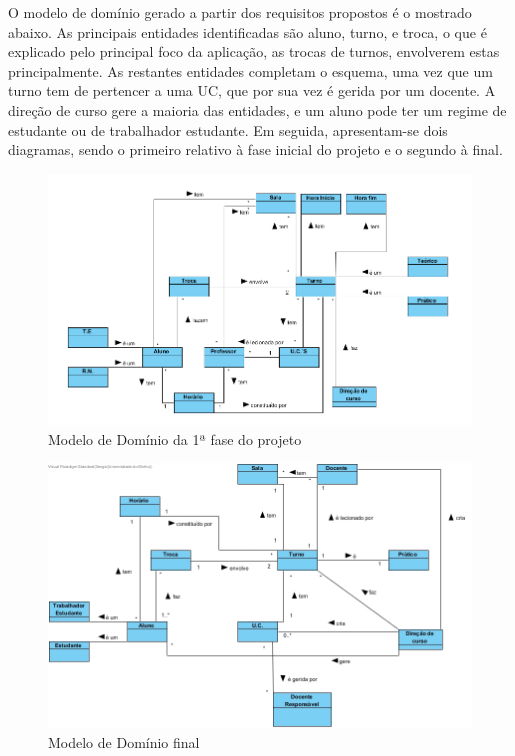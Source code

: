 \documentclass[a4paper]{article}
\begin{document}
O modelo de domínio gerado a partir dos requisitos propostos é o mostrado abaixo. As principais entidades identificadas são aluno, turno, e troca, o que é explicado pelo principal foco da aplicação, as trocas de turnos, envolverem estas principalmente. As restantes entidades completam o esquema, uma vez que um turno tem de pertencer a uma UC, que por sua vez é gerida por um docente. A direção de curso gere a maioria das entidades, e um aluno pode ter um regime de estudante ou de trabalhador estudante.
Em seguida, apresentam-se dois diagramas, sendo o primeiro relativo à fase inicial do projeto e o segundo à final.

\begin{figure}[H]
\centering
\includegraphics[width=14cm]{ModeloDominioAntigo}
\caption{Modelo de Domínio da 1ª fase do projeto}
\label{}
\end{figure}

\begin{figure}[H]
\centering
\includegraphics[width=14cm]{ModeloDominio}
\caption{Modelo de Domínio final}
\label{}
\end{figure}
\end{document}
